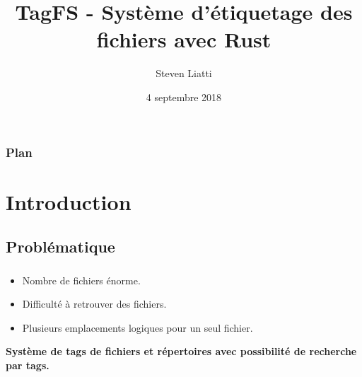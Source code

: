 \documentclass[10pt]{beamer}
\begin{document}

\title{TagFS - Système d'étiquetage des fichiers avec Rust}
\author{Steven Liatti}
\date{4 septembre 2018}

\begin{frame}
\titlepage
\end{frame}

\begin{frame}
    \frametitle{Plan}
    \setcounter{tocdepth}{1}
    \tableofcontents
\end{frame}

\section{Introduction}
\subsection{Problématique}
\begin{frame}
    \frametitle{\subsecname}
    \begin{itemize}
        \item Nombre de fichiers énorme.
        \pause
        \item Difficulté à retrouver des fichiers.
        \pause
        \item Plusieurs emplacements logiques pour un seul fichier.
        \pause
    \end{itemize}
    \Large\textbf{Système de tags de fichiers et répertoires avec possibilité de recherche par tags.}
\end{frame}
\end{document}
